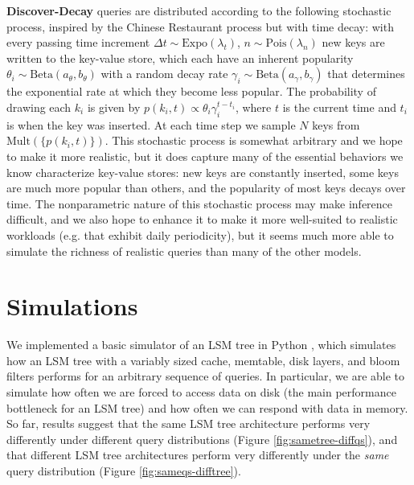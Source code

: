 \documentclass{sig-alternate-05-2015}
\begin{document}
\textbf{Discover-Decay} queries are distributed according to the following
stochastic process, inspired by the Chinese Restaurant process \cite{crp} but
with time decay: with every passing time increment $\Delta t \sim
\textrm{Expo}(\lambda_t)$, $n \sim \textrm{Pois}(\lambda_n)$ new keys are written to the
key-value store, which each have an inherent popularity $\theta_i \sim
\textrm{Beta}(a_\theta,b_\theta)$ with a random decay rate $\gamma_i \sim
\textrm{Beta}(a_\gamma,b_\gamma)$ that determines the exponential rate at which they
become less popular. The probability of drawing each $k_i$ is given by
$p(k_i,t) \propto \theta_i\gamma_i^{t-t_i}$, where $t$ is the current time and
$t_i$ is when the key was inserted. At each time step we sample $N$ keys from
$\textrm{Mult}(\{p(k_i,t)\})$. This stochastic process is somewhat arbitrary and we
hope to make it more realistic, but it does capture many of the essential
behaviors we know characterize key-value stores: new keys are constantly
inserted, some keys are much more popular than others, and the popularity of
most keys decays over time. The nonparametric nature of this stochastic process
may make inference difficult, and we also hope to enhance it to make it more
well-suited to realistic workloads (e.g. that exhibit daily periodicity), but
it seems much more able to simulate the richness of realistic queries than many
of the other models.

\section{Simulations}

We implemented a basic simulator of an LSM tree in Python \cite{lsmulator},
which simulates how an LSM tree with a variably sized cache, memtable, disk
layers, and bloom filters performs for an arbitrary sequence of queries. In
particular, we are able to simulate how often we are forced to access data on
disk (the main performance bottleneck for an LSM tree) and how often we can
respond with data in memory. So far, results suggest that the same LSM tree
architecture performs very differently under different query distributions
(Figure \ref{fig:sametree-diffqs}), and that different LSM tree architectures
perform very differently under the \textit{same} query distribution (Figure
\ref{fig:sameqs-difftree}). 
\end{document}

